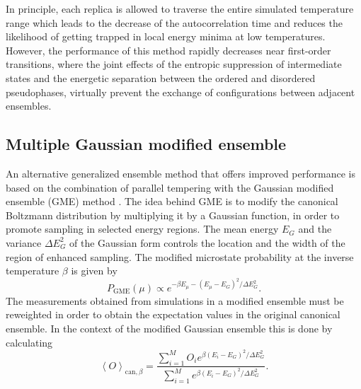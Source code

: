 \documentclass[12pt]{report}
\begin{document}
In principle, each replica is allowed to traverse the entire simulated
temperature range which leads to the decrease of the autocorrelation time and reduces the likelihood of getting trapped in local energy minima at low temperatures. However, the performance of this method rapidly decreases near first-order transitions, where the joint effects of the entropic suppression of intermediate states and the energetic separation between the ordered and disordered pseudophases, virtually prevent the exchange of configurations between adjacent ensembles.
 
\subsection{Multiple Gaussian modified ensemble}

An alternative generalized ensemble method that offers improved performance is based on the combination of parallel tempering with the Gaussian modified ensemble (GME) method \cite{Neuhaus2006}. The idea behind GME is to modify the canonical Boltzmann distribution by multiplying it by a Gaussian function, in order to promote sampling in selected energy regions. The mean energy $E_{G}$ and the variance $\Delta E_{G}^{2}$ of the Gaussian form controls the location and the width of the region of enhanced sampling. The modified microstate probability at the inverse temperature $\beta$ is given by
%
\begin{equation}
P_{\mathrm{GME}}(\mu) \propto e^{-\beta E_{\mu} -
\left(E_{\mu} - E_{G}\right)^{2} / \Delta E_{G}^{2}}.
\end{equation}
% 
The measurements obtained from simulations in a modified ensemble must be reweighted in order to obtain the expectation values in the original canonical ensemble. In the context of the modified Gaussian ensemble this is done by calculating
\begin{equation}
\left\langle O \right\rangle_{\mathrm{can},\beta} = \frac{\displaystyle \sum_{i=1}^{M} O_{i}e^{\beta 
\left(E_{i} - E_{G}\right)^{2} / \Delta E_{G}^{2}}}{\displaystyle \sum_{i=1}^{M} e^{\beta 
\left(E_{i} - E_{G}\right)^{2} / \Delta E_{G}^{2}}}.
\end{equation} 
%
\end{document}
